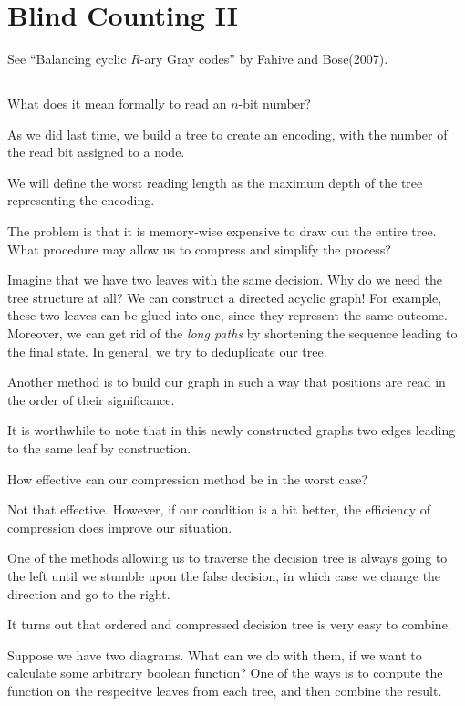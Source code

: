 \documentclass[11pt]{scrartcl}
\begin{document}
  \section{Blind Counting II}
  
  See ``Balancing cyclic $R$-ary Gray codes'' by Fahive and Bose(2007).
  
  \subsection{}

  What does it mean formally to read an $n$-bit number?

  As we did last time, we build a tree to create an encoding, with the
  number of the read bit assigned to a node.

  We will define the worst reading length as the maximum depth of the
  tree representing the encoding.

  The problem is that it is memory-wise expensive to draw out the
  entire tree. What procedure may allow us to compress and simplify
  the process?

  Imagine that we have two leaves with the same decision. Why do we
  need the tree structure at all? We can construct a directed acyclic
  graph! For example, these two leaves can be glued into one, since
  they represent the same outcome. Moreover, we can get rid of the
  \textit{long paths} by shortening the sequence leading to the final
  state. In general, we try to deduplicate our tree.

  Another method is to build our graph in such a way that positions
  are read in the order of their significance.

  It is worthwhile to note that in this newly constructed graphs two
  edges leading to the same leaf by construction.

  How effective can our compression method be in the worst case?

  Not that effective. However, if our condition is a bit better, the
  efficiency of compression does improve our situation.

  One of the methods allowing us to traverse the decision tree is
  always going to the left until we stumble upon the false decision,
  in which case we change the direction and go to the right.

  It turns out that ordered and compressed decision tree is very easy
  to combine.

  Suppose we have two diagrams. What can we do with them, if we want
  to calculate some arbitrary boolean function? One of the ways is to
  compute the function on the respecitve leaves from each tree, and
  then combine the result.
\end{document}
